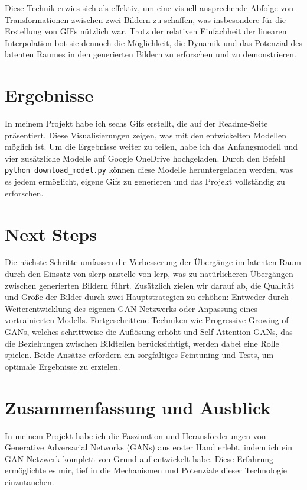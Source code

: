 \documentclass[a4paper, 12pt]{article}
\begin{document}
Diese Technik erwies sich als effektiv, um eine visuell ansprechende Abfolge von Transformationen zwischen zwei Bildern zu schaffen, was insbesondere für die Erstellung von GIFs nützlich war. Trotz der relativen Einfachheit der linearen Interpolation bot sie dennoch die Möglichkeit, die Dynamik und das Potenzial des latenten Raumes in den generierten Bildern zu erforschen und zu demonstrieren.


\section{Ergebnisse}
In meinem Projekt habe ich sechs Gifs erstellt, die auf der Readme-Seite präsentiert. Diese Visualisierungen zeigen, was mit den entwickelten Modellen möglich ist. Um die Ergebnisse weiter zu teilen, habe ich das Anfangsmodell und vier zusätzliche Modelle auf Google OneDrive hochgeladen. Durch den Befehl \texttt{python download\_model.py} können diese Modelle heruntergeladen werden, was es jedem ermöglicht, eigene Gifs zu generieren und das Projekt vollständig zu erforschen.


\section{Next Steps}
Die nächste Schritte umfassen die Verbesserung der Übergänge im latenten Raum durch den Einsatz von slerp anstelle von lerp, was zu natürlicheren Übergängen zwischen generierten Bildern führt. Zusätzlich zielen wir darauf ab, die Qualität und Größe der Bilder durch zwei Hauptstrategien zu erhöhen: Entweder durch Weiterentwicklung des eigenen GAN-Netzwerks oder Anpassung eines vortrainierten Modells. Fortgeschrittene Techniken wie Progressive Growing of GANs, welches schrittweise die Auflösung erhöht und Self-Attention GANs, das die Beziehungen zwischen Bildteilen berücksichtigt, werden dabei eine Rolle spielen. Beide Ansätze erfordern ein sorgfältiges Feintuning und Tests, um optimale Ergebnisse zu erzielen.


\section{Zusammenfassung und Ausblick}
In meinem Projekt habe ich die Faszination und Herausforderungen von Generative Adversarial Networks (GANs) aus erster Hand erlebt, indem ich ein GAN-Netzwerk komplett von Grund auf entwickelt habe. Diese Erfahrung ermöglichte es mir, tief in die Mechanismen und Potenziale dieser Technologie einzutauchen. 
\end{document}
